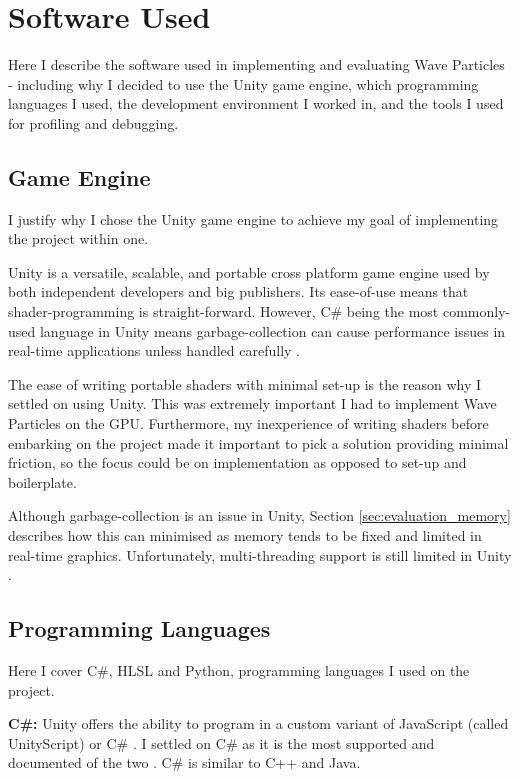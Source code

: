 \documentclass[12pt,a4paper,twoside]{report}
\begin{document}
\section{Software Used}

Here I describe the software used in implementing and evaluating Wave Particles
- including why I decided to use the Unity game engine, which programming
languages I used, the development environment I worked in, and the tools I used
for profiling and debugging.

\subsection{Game Engine}

I justify why I chose the Unity game engine to achieve my goal of implementing
the project within one.

Unity is a versatile, scalable, and portable cross platform game engine used by
both independent developers and big publishers. Its ease-of-use means that
shader-programming is straight-forward. However, C\# being the most
commonly-used language in Unity means garbage-collection can cause performance
issues in real-time applications unless handled carefully
\cite{UnitySharpWins}. %

The ease of writing portable shaders with minimal set-up is the reason why I
settled on using Unity. This was extremely important I had to implement Wave
Particles on the GPU. Furthermore, my inexperience of writing shaders before
embarking on the project made it important to pick a solution providing minimal
friction, so the focus could be on implementation as opposed to set-up and
boilerplate.

Although garbage-collection is an issue in Unity, Section
\ref{sec:evaluation_memory} describes how this can minimised as memory tends to
be fixed and limited in real-time graphics. Unfortunately, multi-threading
support is still limited in Unity \cite{UnityBadThreading}.

\subsection{Programming Languages}

Here I cover C\#, HLSL and Python, programming languages I used on the project.

\textbf{C\#:} Unity offers the ability to program in a custom variant of
JavaScript (called UnityScript) or C\# \cite{UnityScripts}. I settled on C\# as
it is the most supported and documented of the two \cite{UnitySharpWins}. C\#
is similar to C++ and Java.
\end{document}

